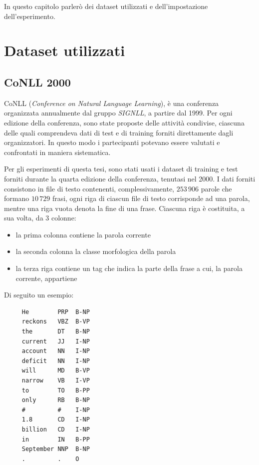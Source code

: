 \nocite{scikit-learn}

In questo capitolo parler\`o dei dataset utilizzati e dell'impostazione dell'esperimento.

\section{Dataset utilizzati}
\nocite{Zanchetta:2005}
\nocite{Attardi:2008}

\subsection{CoNLL 2000}
CoNLL (\emph{Conference on Natural Language Learning}), \`e una conferenza
organizzata annualmente dal gruppo \emph{SIGNLL}, a partire dal 1999. Per ogni
edizione della conferenza, sono state proposte delle attivit\`a condivise, ciascuna
delle quali comprendeva dati di test e di training forniti direttamente dagli
organizzatori. In questo modo i partecipanti potevano essere valutati e
confrontati in maniera sistematica.

Per gli esperimenti di questa tesi, sono stati usati i dataset di training e
test forniti durante la quarta edizione della conferenza, tenutasi nel 2000.
I dati forniti consistono in file di testo contenenti, complessivamente, $253\,906$
parole che formano $10\,729$ frasi, ogni riga di ciascun file di testo corrisponde
ad una parola, mentre una riga vuota denota la fine di una frase. Ciascuna riga
\`e costituita, a sua volta, da 3 colonne:

\begin{itemize}
  \item la prima colonna contiene la parola corrente
  \item la seconda colonna la classe morfologica della parola
  \item la terza riga contiene un tag che indica la parte della frase a cui,
        la parola corrente, appartiene
\end{itemize}

Di seguito un esempio:

\begin{center}
  \begin{minipage}{5cm}
    \begin{verbatim}
     He        PRP  B-NP
     reckons   VBZ  B-VP
     the       DT   B-NP
     current   JJ   I-NP
     account   NN   I-NP
     deficit   NN   I-NP
     will      MD   B-VP
     narrow    VB   I-VP
     to        TO   B-PP
     only      RB   B-NP
     #         #    I-NP
     1.8       CD   I-NP
     billion   CD   I-NP
     in        IN   B-PP
     September NNP  B-NP
     .         .    O
    \end{verbatim}
  \end{minipage}
\end{center}

